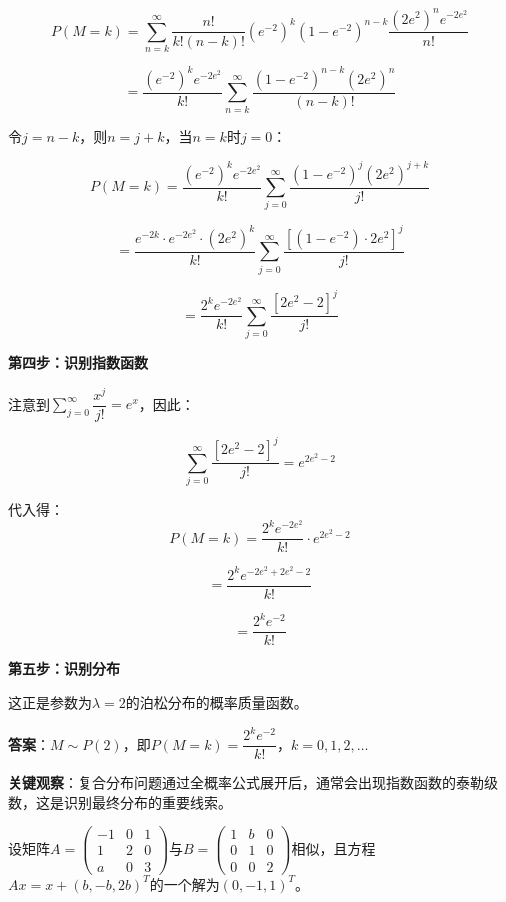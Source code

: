 \documentclass[standard]{ExBook}
\begin{document}
\begin{qitems}
\begin{bbox}
\begin{solution}
            $$P(M=k) = \sum_{n=k}^{\infty} \frac{n!}{k!(n-k)!} (e^{-2})^k (1-e^{-2})^{n-k} \frac{(2e^2)^n e^{-2e^2}}{n!}$$
            
            $$= \frac{(e^{-2})^k e^{-2e^2}}{k!} \sum_{n=k}^{\infty} \frac{(1-e^{-2})^{n-k}(2e^2)^n}{(n-k)!}$$
            
            令$j = n-k$，则$n = j+k$，当$n=k$时$j=0$：
            
            $$P(M=k) = \frac{(e^{-2})^k e^{-2e^2}}{k!} \sum_{j=0}^{\infty} \frac{(1-e^{-2})^j (2e^2)^{j+k}}{j!}$$
            
            $$= \frac{e^{-2k} \cdot e^{-2e^2} \cdot (2e^2)^k}{k!} \sum_{j=0}^{\infty} \frac{[(1-e^{-2}) \cdot 2e^2]^j}{j!}$$
            
            $$= \frac{2^k e^{-2e^2}}{k!} \sum_{j=0}^{\infty} \frac{[2e^2 - 2]^j}{j!}$$
            
            \textbf{第四步：识别指数函数}
            
            注意到$\sum\limits_{j=0}^{\infty} \dfrac{x^j}{j!} = e^x$，因此：
            
            $$\sum_{j=0}^{\infty} \frac{[2e^2 - 2]^j}{j!} = e^{2e^2 - 2}$$
            
            代入得：
            $$P(M=k) = \frac{2^k e^{-2e^2}}{k!} \cdot e^{2e^2 - 2}$$
            
            $$= \frac{2^k e^{-2e^2 + 2e^2 - 2}}{k!}$$
            
            $$= \frac{2^k e^{-2}}{k!}$$
            
            \textbf{第五步：识别分布}
            
            这正是参数为$\lambda = 2$的泊松分布的概率质量函数。
            
            \textbf{答案}：$\boxed{M \sim P(2)}$，即$P(M=k) = \dfrac{2^k e^{-2}}{k!}$，$k=0,1,2,\dots$
            
            \textbf{关键观察}：复合分布问题通过全概率公式展开后，通常会出现指数函数的泰勒级数，这是识别最终分布的重要线索。
        \end{solution}
    \end{bbox}

    \begin{bbox}
        \qitem 设矩阵$A = \begin{pmatrix} -1 & 0 & 1 \\ 1 & 2 & 0 \\ a & 0 & 3 \end{pmatrix}$与$B = \begin{pmatrix} 1 & b & 0 \\ 0 & 1 & 0 \\ 0 & 0 & 2 \end{pmatrix}$相似，且方程$Ax = x + (b, -b, 2b)^T$的一个解为$(0, -1, 1)^T$。
        

\end{bbox}
\end{qitems}
\end{document}
